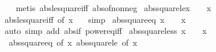 \begin{isabellebody}
%
\isadelimproof
\ \ %
\endisadelimproof
%
\isatagproof
{}\isamarkupfalse%
\ {\isacharparenleft}{\kern0pt}metis\ abs{\isacharunderscore}{\kern0pt}le{\isacharunderscore}{\kern0pt}square{\isacharunderscore}{\kern0pt}iff\ abs{\isacharunderscore}{\kern0pt}of{\isacharunderscore}{\kern0pt}nonneg{\isacharparenright}{\kern0pt}%
\endisatagproof
{\isafoldproof}%
%
\isadelimproof
\isanewline
%
\endisadelimproof
\isanewline
{}\isamarkupfalse%
\ abs{\isacharunderscore}{\kern0pt}square{\isacharunderscore}{\kern0pt}le{\isacharunderscore}{\kern0pt}{}{\isacharcolon}{\kern0pt}{\isachardoublequoteopen}x\ {\isasymle}\ {}\ {\isasymlongleftrightarrow}\ {\isasymbar}x{\isasymbar}\ {\isasymle}\ {}{\isachardoublequoteclose}\isanewline
%
\isadelimproof
\ \ %
\endisadelimproof
%
\isatagproof
{}\isamarkupfalse%
\ abs{\isacharunderscore}{\kern0pt}le{\isacharunderscore}{\kern0pt}square{\isacharunderscore}{\kern0pt}iff\ {\isacharbrackleft}{\kern0pt}of\ x\ {}{\isacharbrackright}{\kern0pt}\ \isamarkupfalse%
\ simp%
\endisatagproof
{\isafoldproof}%
%
\isadelimproof
\isanewline
%
\endisadelimproof
\isanewline
{}\isamarkupfalse%
\ abs{\isacharunderscore}{\kern0pt}square{\isacharunderscore}{\kern0pt}eq{\isacharunderscore}{\kern0pt}{}{\isacharcolon}{\kern0pt}\ {\isachardoublequoteopen}x\ {\isacharequal}{\kern0pt}\ {}\ {\isasymlongleftrightarrow}\ {\isasymbar}x{\isasymbar}\ {\isacharequal}{\kern0pt}\ {}{\isachardoublequoteclose}\isanewline
%
\isadelimproof
\ \ %
\endisadelimproof
%
\isatagproof
{}\isamarkupfalse%
\ {\isacharparenleft}{\kern0pt}auto\ simp\ add{\isacharcolon}{\kern0pt}\ abs{\isacharunderscore}{\kern0pt}if\ power{}{\isacharunderscore}{\kern0pt}eq{\isacharunderscore}{\kern0pt}{}{\isacharunderscore}{\kern0pt}iff{\isacharparenright}{\kern0pt}%
\endisatagproof
{\isafoldproof}%
%
\isadelimproof
\isanewline
%
\endisadelimproof
\isanewline
{}\isamarkupfalse%
\ abs{\isacharunderscore}{\kern0pt}square{\isacharunderscore}{\kern0pt}less{\isacharunderscore}{\kern0pt}{}{\isacharcolon}{\kern0pt}\ {\isachardoublequoteopen}x\ {\isacharless}{\kern0pt}\ {}\ {\isasymlongleftrightarrow}\ {\isasymbar}x{\isasymbar}\ {\isacharless}{\kern0pt}\ {}{\isachardoublequoteclose}\isanewline
%
\isadelimproof
\ \ %
\endisadelimproof
%
\isatagproof
{}\isamarkupfalse%
\ \ abs{\isacharunderscore}{\kern0pt}square{\isacharunderscore}{\kern0pt}eq{\isacharunderscore}{\kern0pt}{}\ {\isacharbrackleft}{\kern0pt}of\ x{\isacharbrackright}{\kern0pt}\ abs{\isacharunderscore}{\kern0pt}square{\isacharunderscore}{\kern0pt}le{\isacharunderscore}{\kern0pt}{}\ {\isacharbrackleft}{\kern0pt}of\ x{\isacharbrackright}{\kern0pt}\ \isamarkupfalse%

\end{isabellebody}

